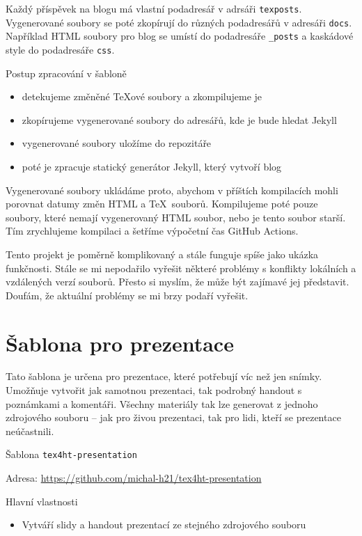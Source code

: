 Každý příspěvek na blogu má vlastní podadresář v adrsáři \texttt{texposts}. 
Vygenerované soubory se poté zkopírují do různých podadresářů v adresáři 
\texttt{docs}. Například HTML soubory pro blog se umístí do podadresáře 
\verb|_posts| a kaskádové style do podadresáře \texttt{css}.

\begin{frame}[fragile]{Postup zpracování v šabloně}
\begin{itemize}
\item detekujeme změněné \TeX ové soubory a zkompilujeme je
\item zkopírujeme vygenerované soubory do adresářů, kde je bude hledat Jekyll
\item vygenerované soubory uložíme do repozitáře
\item poté je zpracuje statický generátor Jekyll, který vytvoří blog
\end{itemize}
\end{frame}

Vygenerované soubory ukládáme proto, abychom v příštích kompilacích 
mohli porovnat datumy změn HTML a \TeX\ souborů. Kompilujeme poté pouze soubory, 
které nemají vygenerovaný HTML soubor, nebo je tento soubor starší.
Tím zrychlujeme kompilaci a šetříme výpočetní čas GitHub Actions. 

Tento projekt je poměrně komplikovaný a stále funguje spíše jako 
ukázka funkčnosti. Stále se mi nepodařilo vyřešit některé problémy 
s konflikty lokálních a vzdálených verzí souborů. Přesto si myslím, 
že může být zajímavé jej představit. Doufám, že aktuální problémy se 
mi brzy podaří vyřešit.



\section{Šablona pro prezentace}

Tato šablona je určena pro prezentace, které potřebují víc než jen snímky.
Umožňuje vytvořit jak samotnou prezentaci, tak podrobný handout s poznámkami a
komentáři. Všechny materiály tak lze generovat z jednoho zdrojového souboru –
jak pro živou prezentaci, tak pro lidi, kteří se prezentace neúčastnili.

\begin{frame}[fragile]{Šablona \texttt{tex4ht-presentation}}

\begin{block}{Adresa:}
\url{https://github.com/michal-h21/tex4ht-presentation}
\end{block}

\begin{block}{Hlavní vlastnosti}
  \begin{itemize}
    \item Vytváří slidy a handout prezentací ze stejného zdrojového souboru
  \end{itemize}
\end{block}

\end{frame}

